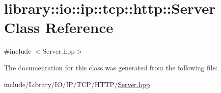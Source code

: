 \hypertarget{classlibrary_1_1io_1_1ip_1_1tcp_1_1http_1_1_server}{}\section{library\+:\+:io\+:\+:ip\+:\+:tcp\+:\+:http\+:\+:Server Class Reference}
\label{classlibrary_1_1io_1_1ip_1_1tcp_1_1http_1_1_server}


{\ttfamily \#include $<$Server.\+hpp$>$}



The documentation for this class was generated from the following file\+:\begin{DoxyCompactItemize}
\item 
include/\+Library/\+I\+O/\+I\+P/\+T\+C\+P/\+H\+T\+T\+P/\hyperlink{_h_t_t_p_2_server_8hpp}{Server.\+hpp}\end{DoxyCompactItemize}
